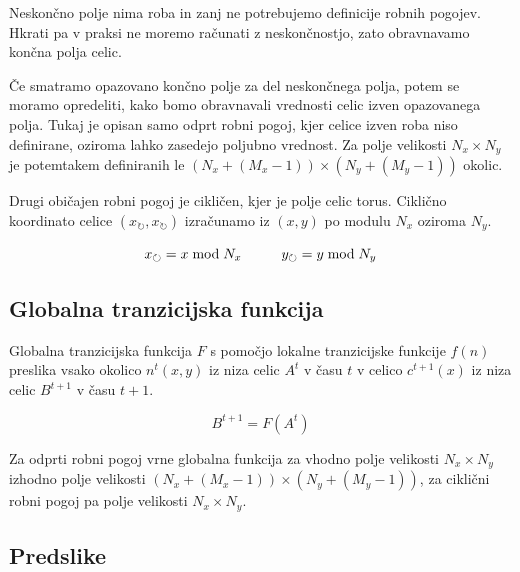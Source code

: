 \documentclass[12pt,a4paper,openany,twoside]{book}
\begin{document}
Neskončno polje nima roba in zanj ne potrebujemo definicije robnih pogojev.
Hkrati pa v praksi ne moremo računati z neskončnostjo,
zato obravnavamo končna polja celic.

Če smatramo opazovano končno polje za del neskončnega polja,
potem se moramo opredeliti, kako bomo obravnavali vrednosti celic izven opazovanega polja.
Tukaj je opisan samo odprt robni pogoj, kjer celice izven roba niso definirane,
oziroma lahko zasedejo poljubno vrednost.
Za polje velikosti \(N_x \times N_y\) je potemtakem definiranih le \((N_x+(M_x-1)) \times (N_y+(M_y-1))\) okolic.

Drugi običajen robni pogoj je cikličen, kjer je polje celic torus.
Ciklično koordinato celice \((x_{\circlearrowright},x_{\circlearrowright})\) izračunamo iz \((x,y)\) po modulu \(N_x\) oziroma \(N_y\).

\begin{equation}
x_{\circlearrowright} = x \bmod N_x
\hspace{10mm}
y_{\circlearrowright} = y \bmod N_y
\end{equation}

\subsection{Globalna tranzicijska funkcija}

Globalna tranzicijska funkcija \(F\) s pomočjo lokalne tranzicijske funkcije \(f(n)\)
preslika vsako okolico \(n^t(x,y)\) iz niza celic \(A^t\) v času \(t\)
v celico \(c^{t+1}(x)\) iz niza celic \(B^{t+1}\) v času \(t+1\).

\begin{equation}
B^{t+1} = F (A^t)
\end{equation}

Za odprti robni pogoj vrne globalna funkcija za vhodno polje velikosti \(N_x \times N_y\)
izhodno polje velikosti \((N_x+(M_x-1)) \times (N_y+(M_y-1))\),
za ciklični robni pogoj pa polje velikosti \(N_x \times N_y\).

\subsection{Predslike}
\end{document}
